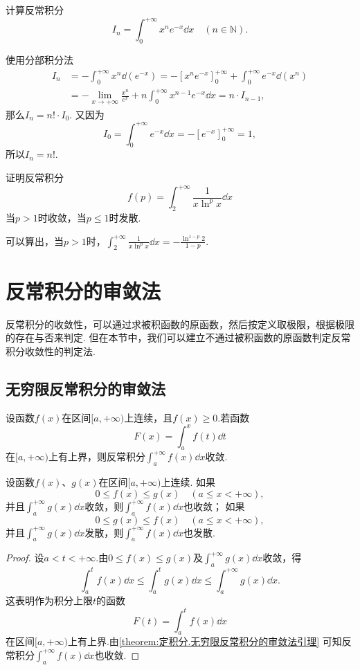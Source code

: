 \begin{example}\label{example:定积分.伽马函数}
计算反常积分\[
I_n = \int_0^{+\infty} x^n e^{-x} \dd{x}
\quad(n\in\mathbb{N}).
\]
\begin{solution}
使用分部积分法\[
\begin{split}
I_n
&= -\int_0^{+\infty} x^n \dd(e^{-x})
= -\left[ x^n e^{-x} \right]_0^{+\infty}
	+ \int_0^{+\infty} e^{-x} \dd(x^n) \\
&= -\lim\limits_{x\to+\infty} \frac{x^n}{e^x}
	+ n \int_0^{+\infty} x^{n-1} e^{-x} \dd{x}
= n \cdot I_{n-1},
\end{split}
\]那么\(I_n = n! \cdot I_0\).
又因为\[
I_0 = \int_0^{+\infty} e^{-x} \dd{x}
= -\left[ e^{-x} \right]_0^{+\infty}
= 1,
\]所以\(I_n = n!\).
\end{solution}
\end{example}

\begin{example}
证明反常积分\[
f(p) = \int_2^{+\infty} \frac{1}{x \ln^p x} \dd{x}
\]当\(p>1\)时收敛，当\(p\leqslant1\)时发散.
\end{example}
可以算出，当\(p>1\)时，\(\int_2^{+\infty} \frac{1}{x \ln^p x} \dd{x}
= -\frac{\ln^{1-p}2}{1-p}\).

\section{反常积分的审敛法}
反常积分的收敛性，可以通过求被积函数的原函数，然后按定义取极限，根据极限的存在与否来判定.
但在本节中，我们可以建立不通过被积函数的原函数判定反常积分收敛性的判定法.

\subsection{无穷限反常积分的审敛法}
\begin{theorem}\label{theorem:定积分.无穷限反常积分的审敛法引理}
设函数\(f(x)\)在区间\([a,+\infty)\)上连续，且\(f(x) \geqslant 0\).若函数\[
F(x)=\int_a^x f(t) \dd{t}
\]在\([a,+\infty)\)上有上界，则反常积分\(\int_a^{+\infty} f(x) \dd{x}\)收敛.
\end{theorem}

\begin{theorem}[比较审敛原理]\label{theorem:定积分.无穷限反常积分的比较审敛原理}
设函数\(f(x)\)、\(g(x)\)在区间\([a,+\infty)\)上连续.
如果\[
0 \leqslant f(x) \leqslant g(x) \quad (a \leqslant x < +\infty),
\]并且\(\int_a^{+\infty} g(x) \dd{x}\)收敛，则\(\int_a^{+\infty} f(x) \dd{x}\)也收敛；
如果\[
0 \leqslant g(x) \leqslant f(x) \quad (a \leqslant x < +\infty),
\]并且\(\int_a^{+\infty} g(x) \dd{x}\)发散，则\(\int_a^{+\infty} f(x) \dd{x}\)也发散.
\begin{proof}
设\(a < t < +\infty\).由\(0 \leqslant f(x) \leqslant g(x)\)及\(\int_a^{+\infty} g(x) \dd{x}\)收敛，得\[
\int_a^t f(x) \dd{x}
\leqslant
\int_a^t g(x) \dd{x}
\leqslant
\int_a^{+\infty} g(x) \dd{x}.
\]这表明作为积分上限\(t\)的函数\[
F(t) = \int_a^t f(x) \dd{x}
\]在区间\([a,+\infty)\)上有上界.由\cref{theorem:定积分.无穷限反常积分的审敛法引理} 可知反常积分\(\int_a^{+\infty} f(x) \dd{x}\)也收敛.
\end{proof}
\end{theorem}

